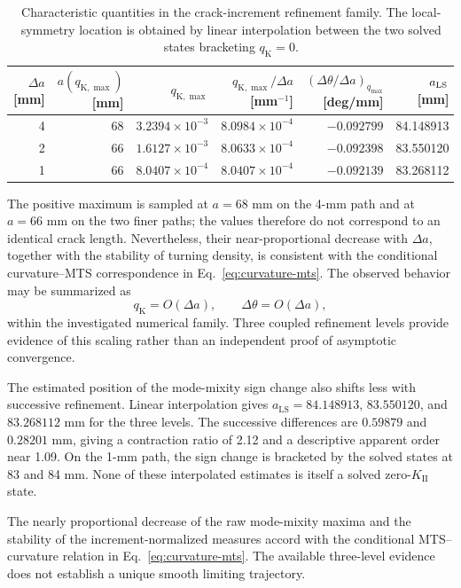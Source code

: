 \documentclass[11pt]{article}
\begin{document}
\begin{table}[tbp]
\centering
\small
\setlength{\tabcolsep}{3.6pt}
\caption{Characteristic quantities in the crack-increment refinement
family. The local-symmetry location is obtained by linear interpolation
between the two solved states bracketing $q_{\mathrm{K}}=0$.}
\label{tab:increment-characteristic}
\begin{tabular}{rrrrrr}
\toprule
$\Delta a$ [mm] &
$a(q_{\mathrm{K},\max})$ [mm] &
$q_{\mathrm{K},\max}$ &
$q_{\mathrm{K},\max}/\Delta a$ [mm$^{-1}$] &
$(\Delta\theta/\Delta a)_{q_{\max}}$ [deg/mm] &
$a_{\rm LS}$ [mm]\\
\midrule
4 & 68 & $3.2394\times10^{-3}$ & $8.0984\times10^{-4}$ &
$-0.092799$ & 84.148913\\
2 & 66 & $1.6127\times10^{-3}$ & $8.0633\times10^{-4}$ &
$-0.092398$ & 83.550120\\
1 & 66 & $8.0407\times10^{-4}$ & $8.0407\times10^{-4}$ &
$-0.092139$ & 83.268112\\
\bottomrule
\end{tabular}
\end{table}

The positive maximum is sampled at $a=68$ mm on the 4-mm path and
at $a=66$ mm on the two finer paths; the values therefore do not
correspond to an identical crack length. Nevertheless, their
near-proportional decrease with $\Delta a$, together with the
stability of turning density, is consistent with the conditional
curvature--MTS correspondence in Eq.~\eqref{eq:curvature-mts}.
The observed behavior may be summarized as
\begin{equation}
 q_{\mathrm{K}}=O(\Delta a),\qquad
 \Delta\theta=O(\Delta a),
 \label{eq:increment-scaling}
\end{equation}
within the investigated numerical family. Three coupled refinement
levels provide evidence of this scaling rather than an
independent proof of asymptotic convergence.

The estimated position of the mode-mixity sign change
also shifts less with successive refinement. Linear
interpolation gives $a_{\mathrm{LS}}=84.148913$,
$83.550120$, and $83.268112$ mm for the three
levels. The successive differences are $0.59879$
and $0.28201$ mm, giving a contraction ratio of
2.12 and a descriptive apparent order near 1.09.
On the 1-mm path, the sign change is bracketed by
the solved states at 83 and 84 mm. None of these
interpolated estimates is itself a solved
zero-$K_{\mathrm{II}}$ state.

\begin{samepage}
The nearly proportional decrease of the raw mode-mixity
maxima and the stability of the increment-normalized
measures accord with the conditional MTS--curvature
relation in Eq.~\eqref{eq:curvature-mts}. The available
three-level evidence does not establish a unique smooth
limiting trajectory.
\end{samepage}
\end{document}
